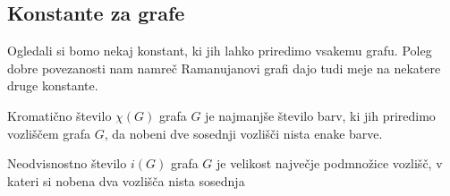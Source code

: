 \subsection{Konstante za grafe}
Ogledali si bomo nekaj konstant, ki jih lahko priredimo vsakemu grafu\cite{ramanujan-construction-book}. Poleg dobre povezanosti nam namreč Ramanujanovi grafi dajo tudi meje na nekatere druge konstante.

\begin{definicija}
    Kromatično število \(\chi(G)\) grafa \(G\) je najmanjše število barv, ki jih priredimo vozliščem grafa \(G\), da nobeni dve sosednji vozlišči nista enake barve.
\end{definicija}
\begin{definicija}
    Neodvisnostno število \(i(G)\) grafa \(G\) je velikost največje podmnožice vozlišč, v kateri si nobena dva vozlišča nista sosednja
\end{definicija}

